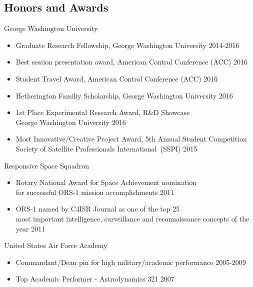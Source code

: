 \subsection*{Honors and Awards} %
{}

George Washington University
\begin{itemize}
    \item Graduate Research Fellowship, George Washington University \hfill {2014-2016}
    \item Best session presentation award, American Control Conference (ACC) \hfill {2016}
    \item Student Travel Award, American Control Conference (ACC) \hfill {2016}
    \item Hetherington Familiy Scholarship, George Washington University \hfill {2016}
    \item{1st Place Experimental Research Award, R\&D Showcase\\ George Washington University} \hfill {2016}
    \item {Most Innovative/Creative Project Award, 5th Annual Student Competition \\ 
    Society of Satellite Professionals International~(SSPI) } \hfill {2015}  
\end{itemize}

Responsive Space Squadron
\begin{itemize}
    \item Rotary National Award for Space Achievement nomination \\
    for successful ORS-1 mission accomplishments \hfill {2011} 
    \item ORS-1 named by C4ISR Journal as one of the top 25\\
     most important intelligence, surveillance and reconnaissance concepts of the year \hfill {2011}
\end{itemize}

United States Air Force Academy
\begin{itemize}
\item Commandant/Dean pin for high military/academic performance \hfill {2005-2009}
\item Top Academic Performer - Astrodynamics 321 \hfill {2007}
\end{itemize}
